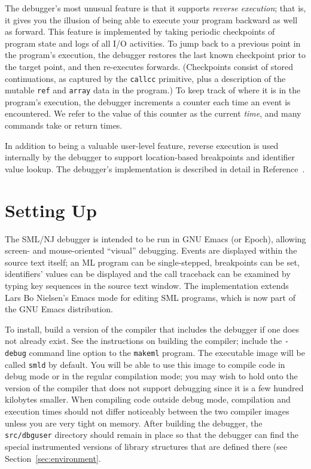 The debugger's most unusual feature is that it supports 
{\em reverse execution}; that is, it gives you the illusion of being able
to execute your program backward as well as forward.  This feature is 
implemented by taking periodic checkpoints of program state and logs of
all I/O activities.  To jump back to a previous point in the program's 
execution, the debugger restores the last known checkpoint prior to the
target point, and then re-executes forwards.  (Checkpoints consist of
stored continuations, as captured by the \verb'callcc' primitive, plus
a description of the mutable \verb'ref' and \verb'array' data in the program.)
To keep track of where it is in the program's execution, the debugger 
increments a counter each time an event is encountered. 
We refer to the value of this counter as the current {\em time}, 
and many commands take or return times.

In addition to being a valuable 
user-level feature, reverse execution is used internally by the debugger
to support location-based breakpoints and identifier value lookup.
The debugger's implementation is described in detail in 
Reference~\cite{thesis}.

\section{Setting Up}
\label{sec:setup}
The SML/NJ debugger is intended to be run in GNU Emacs (or Epoch), 
allowing screen- and mouse-oriented ``visual'' debugging.
Events are displayed within the source text
itself; an ML program can be single-stepped, breakpoints can be set,
identifiers' values can be displayed and the call traceback can be
examined by typing key sequences in the source text window.
The implementation extends Lars Bo Nielsen's Emacs mode for
editing SML programs, which is now part of the GNU Emacs distribution.

To install, build a version of the compiler that includes the debugger if
one does not already exist.  See the instructions on building the
compiler; include the \verb'-debug' command line option to the {\tt makeml}
program.  The executable image will be called {\tt smld}
by default.  You will be
able to use this image to compile code in debug mode or in the regular
compilation mode; you may wish to hold onto the version of the compiler
that does not support debugging since it is a few hundred kilobytes
smaller.  When compiling code outside
debug mode, compilation and execution times should not differ
noticeably between the two compiler images unless you are very tight on memory.
After building the debugger, the \verb'src/dbguser' directory should remain
in place so that the debugger can find the special instrumented 
versions of library structures that are defined there (see
Section~\ref{sec:environment}.

